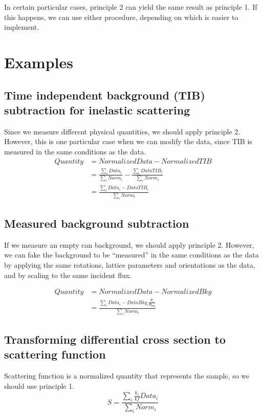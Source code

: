 \documentclass{article}
\begin{document}
In certain particular cases, principle 2 can yield the same result as principle 1. If this happens, we can use either procedure, depending on which is easier to implement.

\section{Examples}
\subsection{Time independent background (TIB) subtraction for inelastic scattering}
Since we measure different physical quantities, we should apply principle 2. However, this is one particular case when we can modify the data, since TIB is measured in the same conditions as the data.
\begin{align}
Quantity&=NormalizedData-NormalizedTIB\\
&=\frac{\sum_{i} Data_i}{\sum_{i} Norm_i}-\frac{\sum_{i} DataTIB_i}{\sum_{i} Norm_i}\\
&=\frac{\sum_{i} Data_i-DataTIB_i}{\sum_{i} Norm_i}
\end{align}

\subsection{Measured background subtraction}
If we measure an empty can background, we should apply principle 2. However, we can fake the background to be ``measured'' in the same conditions as the data by applying the same rotations, lattice parameters and orientations as the data, and by scaling to the same incident flux.

\begin{align}
Quantity&=NormalizedData-NormalizedBkg\\
&=\frac{\sum_{i} Data_i-DataBkg_i \frac{\Phi_i}{\Phi_{bkg}}}{\sum_{i} Norm_i}
\end{align}

\subsection{Transforming differential cross section to scattering function}
Scattering function is a normalized quantity that represents the sample, so we should use principle 1.
\begin{equation}
S=\frac{\sum_{i} \frac{k_i}{kf} Data_i}{\sum_{i} Norm_i}
\end{equation}
\end{document}
